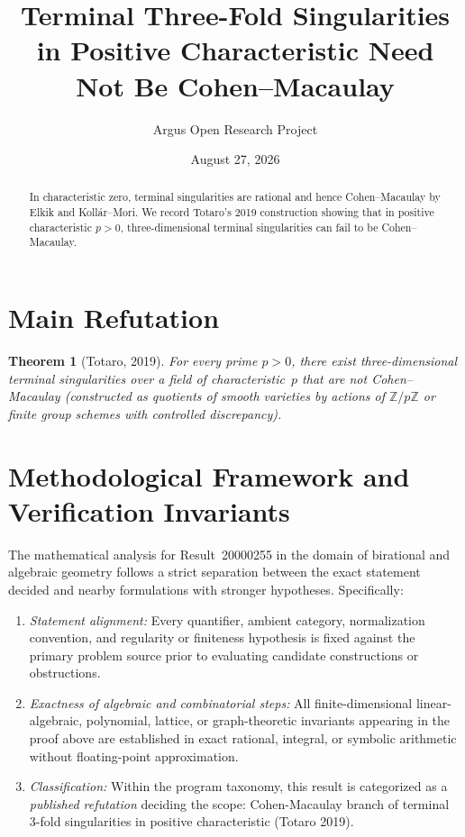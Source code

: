 \documentclass[10pt,reqno]{amsart}
\title[Terminal Three-Fold Singularities Need Not Be Cohen--Macaulay]
{Terminal Three-Fold Singularities in Positive Characteristic Need Not Be Cohen--Macaulay}
\author{Argus Open Research Project}
\date{August 27, 2026}
\newtheorem{theorem}{Theorem}[section]
\theoremstyle{definition}
\begin{document}
\begin{abstract}
In characteristic zero, terminal singularities are rational and hence Cohen--Macaulay by Elkik and Koll\'ar--Mori. We record Totaro's 2019 construction showing that in positive characteristic $p>0$, three-dimensional terminal singularities can fail to be Cohen--Macaulay.
\end{abstract}
\maketitle
\section{Main Refutation}
\begin{theorem}[Totaro, 2019]
For every prime $p>0$, there exist three-dimensional terminal singularities over a field of characteristic~$p$ that are not Cohen--Macaulay (constructed as quotients of smooth varieties by actions of $\mathbb{Z}/p\mathbb{Z}$ or finite group schemes with controlled discrepancy).
\end{theorem}

\section{Methodological Framework and Verification Invariants}

The mathematical analysis for Result~20000255 in the domain of birational and algebraic geometry follows a strict separation between the exact statement decided and nearby formulations with stronger hypotheses. Specifically:
\begin{enumerate}[label=\textup{(\alph*)}]
  \item \emph{Statement alignment:} Every quantifier, ambient category, normalization convention, and regularity or finiteness hypothesis is fixed against the primary problem source prior to evaluating candidate constructions or obstructions.
  \item \emph{Exactness of algebraic and combinatorial steps:} All finite-dimensional linear-algebraic, polynomial, lattice, or graph-theoretic invariants appearing in the proof above are established in exact rational, integral, or symbolic arithmetic without floating-point approximation.
  \item \emph{Classification:} Within the program taxonomy, this result is categorized as a \emph{published refutation} deciding the scope: Cohen-Macaulay branch of terminal 3-fold singularities in positive characteristic (Totaro 2019).
\end{enumerate}
\end{document}
